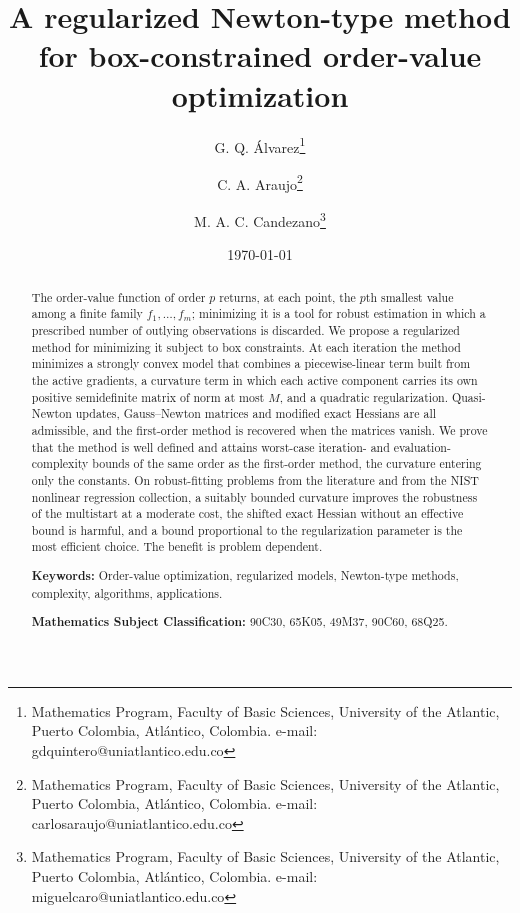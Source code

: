 \documentclass[11pt]{article}
\newcounter{alg}[section]
\begin{document}
\title{A regularized Newton-type method for box-constrained order-value optimization}

\author{
    G. Q. Álvarez\thanks{Mathematics Program, Faculty of Basic Sciences, University of the Atlantic, Puerto Colombia, Atlántico, Colombia. e-mail: gdquintero@uniatlantico.edu.co}
    \and 
    C. A. Araujo\thanks{Mathematics Program, Faculty of Basic Sciences, University of the Atlantic, Puerto Colombia, Atlántico, Colombia. e-mail: carlosaraujo@uniatlantico.edu.co}
    \and
    M. A. C. Candezano\thanks{Mathematics Program, Faculty of Basic Sciences, University of the Atlantic, Puerto Colombia, Atlántico, Colombia. e-mail: miguelcaro@uniatlantico.edu.co}
}

\date{\today}
\maketitle

\begin{abstract}
The order-value function of order $p$ returns, at each point, the $p$th
smallest value among a finite family $f_1,\dots,f_m$; minimizing it is a tool
for robust estimation in which a prescribed number of outlying observations is
discarded. We propose a regularized method for minimizing it subject to box
constraints. At each iteration the method minimizes a strongly convex model
that combines a piecewise-linear term built from the active gradients, a
curvature term in which each active component carries its own positive
semidefinite matrix of norm at most $M$, and a quadratic regularization.
Quasi-Newton updates, Gauss--Newton matrices and modified exact Hessians are
all admissible, and the first-order method is recovered when the matrices
vanish. We prove that the method is well defined and attains worst-case
iteration- and evaluation-complexity bounds of the same order as the
first-order method, the curvature entering only the constants. On
robust-fitting problems from the literature and from the NIST nonlinear
regression collection, a suitably bounded curvature improves the robustness of
the multistart at a moderate cost, the shifted exact Hessian without an
effective bound is harmful, and a bound proportional to the regularization
parameter is the most efficient choice. The benefit is problem dependent.

\medskip
\noindent
\textbf{Keywords:} Order-value optimization, regularized models,
Newton-type methods, complexity, algorithms, applications.

\medskip
\noindent
\textbf{Mathematics Subject Classification:} 90C30, 65K05, 49M37, 90C60, 68Q25.
\end{abstract}
\end{document}
